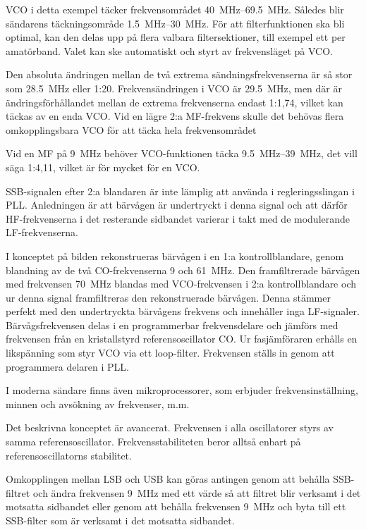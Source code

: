 VCO i detta exempel täcker frekvensområdet \SIrange{40}{69,5}{\mega\hertz}.
Således blir sändarens täckningsområde \SIrange{1,5}{30}{\mega\hertz}.
För att filterfunktionen ska bli optimal, kan den delas upp på flera
valbara filtersektioner, till exempel ett per amatörband.
Valet kan ske automatiskt och styrt av frekvensläget på VCO.

Den absoluta ändringen mellan de två extrema sändningsfrekvenserna är
så stor som \qty{28,5}{\mega\hertz} eller 1:20.
Frekvensändringen i VCO är \qty{29,5}{\mega\hertz}, men där är
ändringsförhållandet mellan de extrema frekvenserna endast 1:1,74, vilket kan
täckas av en enda VCO.
Vid en lägre 2:a MF-frekvens skulle det behövas flera omkopplingsbara
VCO för att täcka hela frekvensområdet

\begin{exempelbox}
Vid en MF på \qty{9}{\mega\hertz} behöver VCO-funktionen täcka
\SIrange{9,5}{39}{\mega\hertz}, det vill säga 1:4,11, vilket är för mycket för
en VCO.
\end{exempelbox}

SSB-signalen efter 2:a blandaren är inte lämplig att använda i
regleringsslingan i PLL.
Anledningen är att bärvågen är undertryckt i denna signal och att därför
HF-frekvenserna i det resterande sidbandet varierar i takt med de
modulerande LF-frekvenserna.

I konceptet på bilden rekonstrueras bärvågen i en 1:a kontrollblandare,
genom blandning av de två CO-frekvenserna 9 och \qty{61}{\mega\hertz}.
Den framfiltrerade bärvågen med frekvensen \qty{70}{\mega\hertz} blandas med
VCO-frekvensen i 2:a kontrollblandare och ur denna signal
framfiltreras den rekonstruerade bärvågen.
Denna stämmer perfekt med den undertryckta bärvågens frekvens och
innehåller inga LF-signaler.
Bärvågsfrekvensen delas i en programmerbar frekvensdelare och jämförs
med frekvensen från en kristallstyrd referensoscillator CO.
Ur fasjämföraren erhålls en likspänning som styr VCO via ett loop-filter.
Frekvensen ställs in genom att programmera delaren i PLL.

I moderna sändare finns även mikroprocessorer, som erbjuder
frekvensinställning, minnen och avsökning av frekvenser, m.m.

Det beskrivna konceptet är avancerat.
Frekvensen i alla oscillatorer styrs av samma referensoscillator.
Frekvensstabiliteten beror alltså enbart på referensoscillatorns stabilitet.

Omkopplingen mellan LSB och USB kan göras antingen genom att behålla SSB-filtret
och ändra frekvensen \qty{9}{\mega\hertz} med ett värde så att filtret blir
verksamt i det motsatta sidbandet eller genom att behålla frekvensen
\qty{9}{\mega\hertz} och byta till ett SSB-filter som är verksamt i det motsatta
sidbandet.

